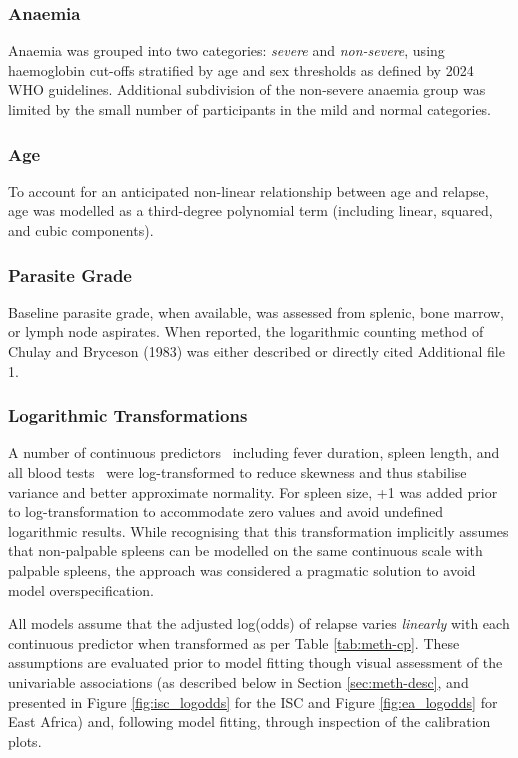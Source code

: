\subsubsection{Anaemia}

Anaemia was grouped into two categories: \emph{severe} and \emph{non-severe}, using haemoglobin cut-offs stratified by age and sex thresholds as defined by 2024 WHO guidelines\cite{who_haem2024}. Additional subdivision of the non-severe anaemia group was limited by the small number of participants in the mild and normal categories.

\subsubsection{Age}

To account for an anticipated non-linear relationship between age and relapse, age was modelled as a third-degree polynomial term (including linear, squared, and cubic components).

\subsubsection{Parasite Grade}

Baseline parasite grade, when available, was assessed from splenic, bone marrow, or lymph node aspirates. When reported, the logarithmic counting method of Chulay and Bryceson (1983) was either described or directly cited {Additional file 1}\cite{chulay1983}.

\subsubsection{Logarithmic Transformations}

A number of continuous predictors \textemdash\ including fever duration, spleen length, and all blood tests \textemdash\ were log-transformed to reduce skewness and thus stabilise variance and better approximate normality. For spleen size, +1 was added prior to log-transformation to accommodate zero values and avoid undefined logarithmic results. While recognising that this transformation implicitly assumes that non-palpable spleens can be modelled on the same continuous scale with palpable spleens, the approach was considered a pragmatic solution to avoid model overspecification.

All models assume that the adjusted log(odds) of relapse varies \textit{linearly} with each continuous predictor when transformed as per Table \ref{tab:meth-cp}. These assumptions are evaluated prior to model fitting though visual assessment of the univariable associations (as described below in Section \ref{sec:meth-desc}, and presented in Figure \ref{fig:isc_logodds} for the ISC and Figure \ref{fig:ea_logodds} for East Africa) and, following model fitting, through inspection of the calibration plots.

